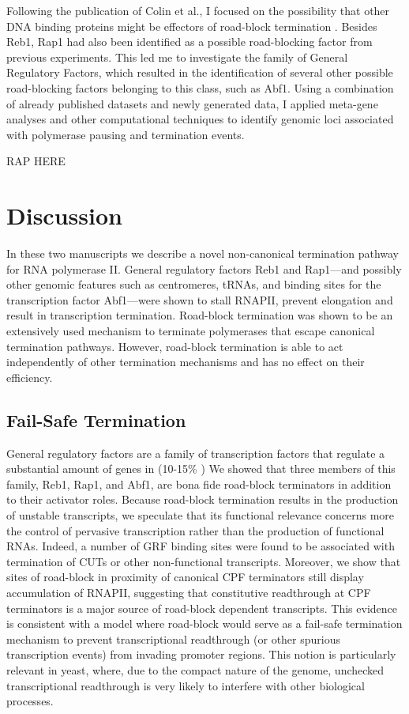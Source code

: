 Following the publication of Colin et al., I focused on the possibility that other DNA binding proteins might be effectors of road-block termination \invivo{}. 
Besides Reb1, Rap1 had also been identified as a possible road-blocking factor from previous experiments. 
This led me to investigate the family of General Regulatory Factors, which resulted in the identification of several other possible road-blocking factors belonging to this class, such as Abf1. 
Using a combination of already published datasets and newly generated data, I applied meta-gene analyses and other computational techniques to identify genomic loci associated with polymerase pausing and termination events. 


\clearpage


%
RAP HERE

\clearpage

\section{Discussion}


In these two manuscripts we describe a novel non-canonical termination pathway for RNA polymerase II.
General regulatory factors Reb1 and Rap1—and possibly other genomic features such as centromeres, tRNAs, and binding sites for the transcription factor Abf1—were shown to stall RNAPII, prevent elongation and result in transcription termination.  
Road-block termination was shown to be an extensively used mechanism to terminate polymerases that escape canonical termination pathways. 
However, road-block termination is able to act independently of other termination mechanisms and has no effect on their efficiency. 

\subsection{Fail-Safe Termination}

General regulatory factors are a family of transcription factors that regulate a substantial amount of genes in \cer{} (10-15\% \cite{rhee:2011:comprehensive}) 
We showed that three members of this family, Reb1, Rap1, and Abf1, are bona fide road-block terminators in addition to their activator roles. 
Because road-block termination results in the production of unstable transcripts, we speculate that its functional relevance concerns more the control of pervasive transcription rather than the production of functional RNAs. 
Indeed, a number of GRF binding sites were found to be associated with termination of CUTs or other non-functional transcripts. 
Moreover, we show that sites of road-block in proximity of canonical CPF terminators still display accumulation of RNAPII, suggesting that constitutive readthrough at CPF terminators is a major source of road-block dependent transcripts. 
This evidence is consistent with a model where road-block would serve as a fail-safe termination mechanism to prevent transcriptional readthrough (or other spurious transcription events) from invading promoter regions. 
This notion is particularly relevant in yeast, where, due to the compact nature of the genome, unchecked transcriptional readthrough is very likely to interfere with other biological processes.  

